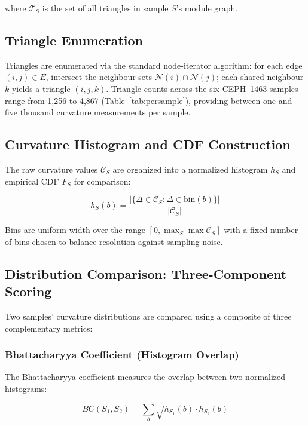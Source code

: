 \documentclass{../yalumba}
\begin{document}
where $\mathcal{T}_S$ is the set of all triangles in sample $S$'s module
graph.

\subsection{Triangle Enumeration}

Triangles are enumerated via the standard node-iterator algorithm: for
each edge $(i,j) \in E$, intersect the neighbour sets $\mathcal{N}(i)
\cap \mathcal{N}(j)$; each shared neighbour $k$ yields a triangle
$(i,j,k)$.  Triangle counts across the six CEPH~1463 samples range from
1{,}256 to 4{,}867 (Table~\ref{tab:persample}), providing between one
and five thousand curvature measurements per sample.

\subsection{Curvature Histogram and CDF Construction}

The raw curvature values $\mathcal{C}_S$ are organized into a normalized
histogram $h_S$ and empirical CDF $F_S$ for comparison:

\begin{equation}
  h_S(b) = \frac{|\{\Delta \in \mathcal{C}_S : \Delta \in \text{bin}(b)\}|}
                 {|\mathcal{C}_S|}
  \label{eq:histogram}
\end{equation}

Bins are uniform-width over the range $[0, \max_S \max \mathcal{C}_S]$ with
a fixed number of bins chosen to balance resolution against sampling noise.

\subsection{Distribution Comparison: Three-Component Scoring}

Two samples' curvature distributions are compared using a composite of three
complementary metrics:

\subsubsection{Bhattacharyya Coefficient (Histogram Overlap)}

The Bhattacharyya coefficient measures the overlap between two normalized
histograms:

\begin{equation}
  BC(S_1, S_2) = \sum_b \sqrt{h_{S_1}(b) \cdot h_{S_2}(b)}
  \label{eq:bhattacharyya}
\end{equation}
\end{document}
